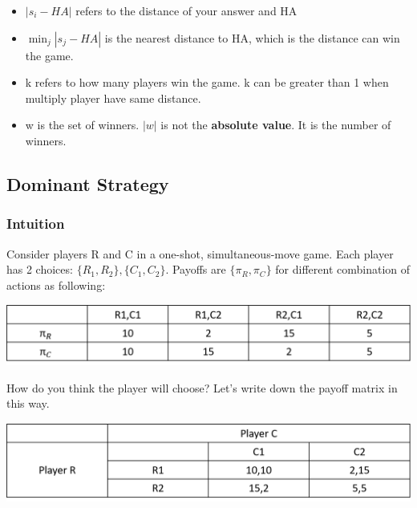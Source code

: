 \documentclass[12pt]{article}
\newcommand{\bb}[1]{{\textbf {#1}}}
\newcommand{\e}[1]{$ #1 $}
\begin{document}
\begin{spacing}{1.5}
                    
                    \begin{itemize}
                        \item \e{|s_i - HA|} refers to the distance of your answer and HA
                        \item \e{\min_j |s_j - HA|} is the nearest distance to HA, which is the distance can win the game.
                        \item k refers to how many players win the game. k can be greater than 1 when multiply player have same distance.
                        \item w is the set of winners. \e{|w|} is not the \bb{absolute value}. It is the number of winners.
                    \end{itemize}
                    

        \subsection{Dominant Strategy}

            \subsubsection{Intuition}

                Consider players R and C in a one-shot, simultaneous-move game. Each player has 2 choices:
                \e{\{R_1, R_2\}, \{C_1, C_2\}}.
                Payoffs are \e{\{ \pi_R, \pi_C\}} for different combination of actions as following:
                \begin{center}
                    \includegraphics[scale = .5]{pic/lecture2/basic_prisoner_initial.png}
                \end{center}

                How do you think the player will choose?
                Let's write down the payoff matrix in this way.

                \begin{center}
                    \includegraphics[scale = .5]{pic/lecture2/basic_prisoner_dilemma.png}
                \end{center}


\end{spacing}
\end{document}
